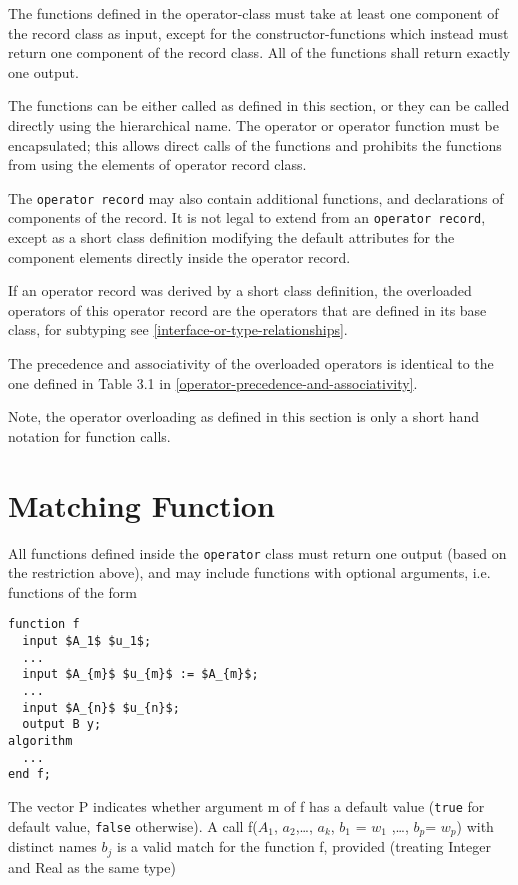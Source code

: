 The functions defined in the operator-class must take at least one
component of the record class as input, except for the
constructor-functions which instead must return one component of the
record class. All of the functions shall return exactly one output.

The functions can be either called as defined in this section, or they
can be called directly using the hierarchical name. The operator or
operator function must be encapsulated; this allows direct calls of the
functions and prohibits the functions from using the elements of
operator record class.

The \lstinline!operator record! may also contain additional functions, and
declarations of components of the record. It is not legal to extend from
an \lstinline!operator record!, except as a short class definition modifying the
default attributes for the component elements directly inside the
operator record.

If an operator record was derived by a short class definition, the
overloaded operators of this operator record are the operators that are
defined in its base class, for subtyping see \autoref{interface-or-type-relationships}.

The precedence and associativity of the overloaded operators is
identical to the one defined in Table 3.1 in \autoref{operator-precedence-and-associativity}.

\begin{nonnormative}
Note, the operator overloading as defined in this section is
only a short hand notation for function calls.
\end{nonnormative}

\section{Matching Function}

All functions defined inside the \lstinline!operator! class must return one
output (based on the restriction above), and may include functions with
optional arguments, i.e. functions of the form

\begin{lstlisting}[language=modelica,mathescape=true]
function f
  input $A_1$ $u_1$;
  ...
  input $A_{m}$ $u_{m}$ := $A_{m}$;
  ...
  input $A_{n}$ $u_{n}$;
  output B y;
algorithm
  ...
end f;
\end{lstlisting}
The vector P indicates whether argument m of f has a default value
(\lstinline!true! for default value, \lstinline!false! otherwise). A call
f($A_1$, $a_{2}$,\ldots{}, $a_{k}$,
$b_{1}$ = $w_{1}$ ,\ldots{}, $b_{p}$=
$w_{p}$) with distinct names $b_{j}$ is a valid
match for the function f, provided (treating Integer and Real as the
same type)

